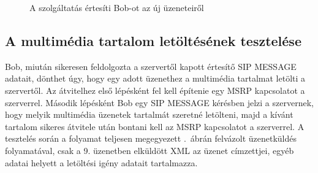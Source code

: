 \begin{figure}[htb]
\center
{}
\caption{A szolgáltatás értesíti Bob-ot az új üzeneteiről}
\label{fig:teszt-vtf-ertesites-01}
\end{figure}

\subsection{A multimédia tartalom letöltésének tesztelése}
\label{sec:teszteles_letoltes}

Bob, miután sikeresen feldolgozta a szervertől kapott értesítő SIP MESSAGE adatait, dönthet úgy, hogy egy adott üzenethez a multimédia tartalmat letölti a szervertől. Az átvitelhez első lépésként fel kell építenie egy MSRP kapcsolatot a szerverrel. Második lépésként Bob egy SIP MESSAGE kérésben jelzi a szervernek, hogy melyik multimédia üzenetek tartalmát szeretné letölteni, majd a kívánt tartalom sikeres átvitele után bontani kell az MSRP kapcsolatot a szerverrel. A tesztelés során a folyamat teljesen megegyezett .~ábrán felvázolt üzenetküldés folyamatával, csak a 9. üzenetben elküldött XML az üzenet címzettjei, egyéb adatai helyett a letöltési igény adatait tartalmazza.



